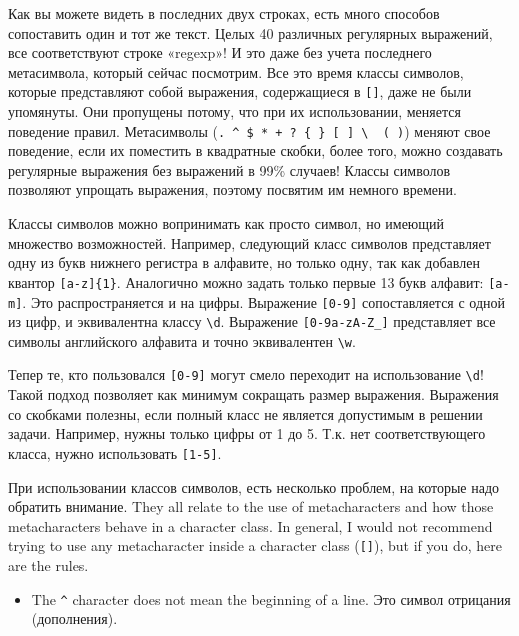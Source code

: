 \documentclass{article}
\begin{document}
Как вы можете видеть в последних двух строках, есть много способов
сопоставить один и тот же текст. Целых 40 различных регулярных
выражений, все соответствуют строке «regexp»! И это даже без учета
последнего метасимвола, который сейчас посмотрим. Все это время классы
символов, которые представляют собой выражения, содержащиеся в
\texttt{{[}{]}}, даже не были упомянуты. Они пропущены потому, что при
их использовании, меняется поведение правил. Метасимволы
(\texttt{.\ \^{}\ \$\ *\ +\ ?\ \{\ \}\ {[}\ {]}\ \textbackslash{}\ \textbar{}\ (\ )})
меняют свое поведение, если их поместить в квадратные скобки, более
того, можно создавать регулярные выражения без выражений в 99\% случаев!
Классы символов позволяют упрощать выражения, поэтому посвятим им
немного времени.

Классы символов можно вопринимать как просто символ, но имеющий
множество возможностей. Например, следующий класс символов представляет
одну из букв нижнего регистра в алфавите, но только одну, так как
добавлен квантор \texttt{{[}a-z{]}\{1\}}. Аналогично можно задать только
первые 13 букв алфавит: \texttt{{[}a-m{]}}. Это распространяется и на
цифры. Выражение \texttt{{[}0-9{]}} сопоставляется с одной из цифр, и
эквивалентна классу \texttt{\textbackslash{}d}. Выражение
\texttt{{[}0-9a-zA-Z\_{]}} представляет все символы английского алфавита
и точно эквивалентен \texttt{\textbackslash{}w}.

Тепер те, кто пользовался \texttt{{[}0-9{]}} могут смело переходит на
использование \texttt{\textbackslash{}d}! Такой подход позволяет как
минимум сокращать размер выражения. Выражения со скобками полезны, если
полный класс не является допустимым в решении задачи. Например, нужны
только цифры от 1 до 5. Т.к. нет соответствующего класса, нужно
использовать \texttt{{[}1-5{]}}.

При использовании классов символов, есть несколько проблем, на которые
надо обратить внимание. They all relate to the use of metacharacters and
how those metacharacters behave in a character class. In general, I
would not recommend trying to use any metacharacter inside a character
class (\texttt{{[}{]}}), but if you do, here are the rules.

\begin{itemize}
\tightlist
\item
  The \texttt{\^{}} character does not mean the beginning of a line. Это
  символ отрицания (дополнения).
\end{itemize}
\end{document}
